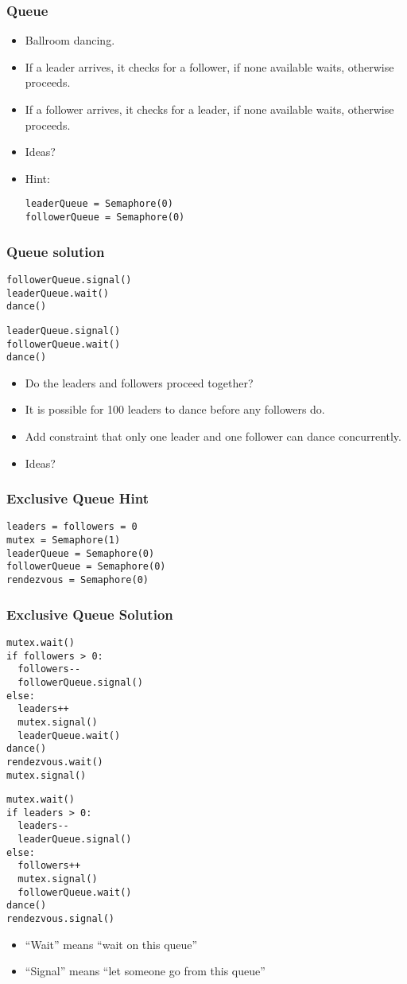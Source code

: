 \documentclass{beamer}
\newcommand{\bi}{\begin{itemize}}
\newcommand{\ii}{\item}
\newcommand{\ei}{\end{itemize}}
\newcommand{\bfr}[1]{\begin{frame}[fragile]\frametitle{{ #1 }}}
\begin{document}
\bfr{Queue}
\bi
\ii Ballroom dancing.
\ii If a leader arrives, it checks for a follower, if none available
waits, otherwise proceeds. 
\ii If a follower arrives, it checks for a leader, if none available
waits, otherwise proceeds. 
\ii Ideas?
\pause
\ii Hint:
\begin{Verbatim}
leaderQueue = Semaphore(0)
followerQueue = Semaphore(0)
\end{Verbatim}
\ei
\end{frame}

\bfr{Queue solution}


\begin{multicols}{2}
\begin{Verbatim}[label=Leader]
followerQueue.signal()
leaderQueue.wait()
dance()
\end{Verbatim}
\begin{Verbatim}[label=Follower]
leaderQueue.signal()
followerQueue.wait()
dance()
\end{Verbatim}
\end{multicols}
\pause
\bi
\ii Do the leaders and followers proceed together?
\pause
\ii It is possible for 100 leaders to dance before any followers do.
\pause
\ii Add constraint that only one leader and one follower can dance
concurrently. 
\ii Ideas?
\ei

\end{frame}
\bfr{Exclusive Queue Hint}
\begin{Verbatim}
leaders = followers = 0
mutex = Semaphore(1)
leaderQueue = Semaphore(0)
followerQueue = Semaphore(0)
rendezvous = Semaphore(0)
\end{Verbatim}

\end{frame}
\bfr{Exclusive Queue Solution}
\begin{multicols}{2}
\begin{Verbatim}[label=Leader]
mutex.wait()
if followers > 0:
  followers--
  followerQueue.signal()
else:
  leaders++
  mutex.signal()
  leaderQueue.wait()
dance()
rendezvous.wait()
mutex.signal()
\end{Verbatim}
\begin{Verbatim}[label=Follower]
mutex.wait()
if leaders > 0:
  leaders--
  leaderQueue.signal()
else:
  followers++
  mutex.signal()
  followerQueue.wait()
dance()
rendezvous.signal()

\end{Verbatim}

\end{multicols}

\bi
\ii ``Wait'' means ``wait on this queue''
\ii ``Signal'' means ``let someone go from this queue''
\ei

\end{frame}
\end{document}
